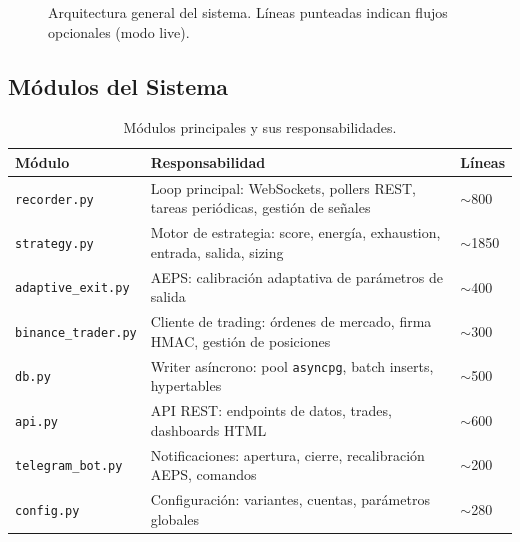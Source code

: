 \documentclass[11pt,a4paper]{article}
\newcommand{\code}[1]{\texttt{\small #1}}
\newcommand{\file}[1]{\texttt{\small\color{cblue}#1}}
\begin{document}
\begin{figure}[H]
\caption{Arquitectura general del sistema. L\'ineas punteadas indican flujos opcionales (modo live).}
\label{fig:arch}
\end{figure}

\subsection{M\'odulos del Sistema}

\begin{table}[H]
\centering
\caption{M\'odulos principales y sus responsabilidades.}
\label{tab:modules}
\begin{tabularx}{\textwidth}{lXl}
\toprule
\textbf{M\'odulo} & \textbf{Responsabilidad} & \textbf{L\'ineas} \\
\midrule
\file{recorder.py} & Loop principal: WebSockets, pollers REST, tareas peri\'odicas, gesti\'on de se\~nales & $\sim$800 \\
\file{strategy.py} & Motor de estrategia: score, energ\'ia, exhaustion, entrada, salida, sizing & $\sim$1850 \\
\file{adaptive\_exit.py} & AEPS: calibraci\'on adaptativa de par\'ametros de salida & $\sim$400 \\
\file{binance\_trader.py} & Cliente de trading: \'ordenes de mercado, firma HMAC, gesti\'on de posiciones & $\sim$300 \\
\file{db.py} & Writer as\'incrono: pool \code{asyncpg}, batch inserts, hypertables & $\sim$500 \\
\file{api.py} & API REST: endpoints de datos, trades, dashboards HTML & $\sim$600 \\
\file{telegram\_bot.py} & Notificaciones: apertura, cierre, recalibraci\'on AEPS, comandos & $\sim$200 \\
\file{config.py} & Configuraci\'on: variantes, cuentas, par\'ametros globales & $\sim$280 \\
\bottomrule
\end{tabularx}
\end{table}
\end{document}
